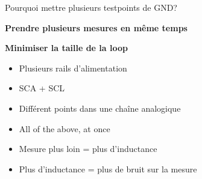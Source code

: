 \begin{frame}{Pourquoi mettre plusieurs testpoints de GND?}
    \vspace{-6pt}
    \vspace{-12pt}

    \begin{twocolumns}
        \leftcol
        \begin{center}
            \textbf{Prendre plusieurs mesures en même temps}
        \end{center}
        \rightcol
        \begin{center}
            \textbf{Minimiser la taille de la loop}
        \end{center}
    \end{twocolumns}

    \begin{twocolumns}
        \leftcol
        \begin{itemize}
            \item Plusieurs rails d'alimentation
            \item SCA + SCL
            \item Différent points dans une chaîne analogique
            \item All of the above, at once
        \end{itemize}

        \rightcol
        \begin{itemize}
            \item Mesure plus loin = plus d'inductance
            \item Plus d'inductance = plus de bruit sur la mesure
        \end{itemize}
    \end{twocolumns}
    \vspace{-12pt}
\end{frame}

